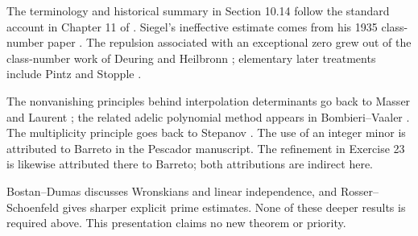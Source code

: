 \documentclass[11pt,twoside,leqno]{article}
\theoremstyle{apostol}
\begin{document}
The terminology and historical summary in Section 10.14 follow the standard
account in Chapter 11 of \cite{montgomery}. Siegel's ineffective estimate
comes from his
1935 class-number paper \cite{siegel}. The repulsion associated with an
exceptional zero grew out of the class-number work of Deuring \cite{deuring}
and Heilbronn \cite{heilbronn}; elementary later treatments include Pintz
\cite{pintz} and Stopple \cite{stopple}.

The nonvanishing principles behind interpolation determinants go back to
Masser \cite{masser} and Laurent \cite{laurent}; the related adelic polynomial
method appears in Bombieri--Vaaler \cite{bombieri}. The multiplicity principle
goes back to Stepanov \cite{stepanov}. The use of an integer minor is attributed
to Barreto \cite{barreto} in the Pescador manuscript. The refinement in
Exercise 23 is likewise attributed there to Barreto; both attributions are
indirect here.

Bostan--Dumas \cite{bostan} discusses Wronskians and linear independence, and
Rosser--Schoenfeld \cite{rosser} gives sharper explicit prime estimates. None
of these deeper results is required above. This presentation claims no new
theorem or priority.
\end{document}
